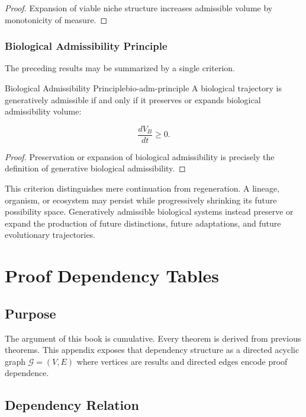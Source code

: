 \documentclass[12pt,twoside,openright]{book}
\begin{document}
\begin{proof}
Expansion of viable niche structure increases admissible
volume by monotonicity of measure.
\end{proof}

\subsection{ Biological Admissibility Principle}

The preceding results may be summarized by a single
criterion.

\begin{theorem}{Biological Admissibility Principle}{bio-adm-principle}
A biological trajectory is generatively admissible if and
only if it preserves or expands biological admissibility
volume:

\[
\frac{dV_B}{dt}
\ge0.
\]
\end{theorem}

\begin{proof}
Preservation or expansion of biological admissibility is
precisely the definition of generative biological
admissibility.
\end{proof}

This criterion distinguishes mere continuation from
regeneration. A lineage, organism, or ecosystem may
persist while progressively shrinking its future
possibility space. Generatively admissible biological
systems instead preserve or expand the production of
future distinctions, future adaptations, and future
evolutionary trajectories.

\chapter{Proof Dependency Tables}
\label{app:deps}

\section{Purpose}

The argument of this book is cumulative.
Every theorem is derived from previous theorems.
This appendix exposes that dependency structure as a
directed acyclic graph $\mathcal{G} = (V, E)$
where vertices are results and directed edges encode
proof dependence.

\section{Dependency Relation}
\end{document}
